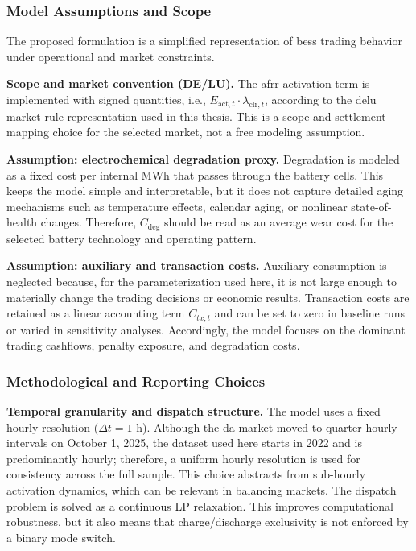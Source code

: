 \subsubsection{Model Assumptions and Scope}
The proposed formulation is a simplified representation of \gls{bess} trading behavior under operational and market constraints.

\textbf{Scope and market convention (DE/LU).}
The \gls{afrr} activation term is implemented with signed quantities, i.e., $E_{\text{act}, t}\cdot\lambda_{\text{clr}, t}$, according to the \gls{delu} market-rule representation used in this thesis.
This is a scope and settlement-mapping choice for the selected market, not a free modeling assumption.

\textbf{Assumption: electrochemical degradation proxy.}
Degradation is modeled as a fixed cost per internal MWh that passes through the battery cells.
This keeps the model simple and interpretable, but it does not capture detailed aging mechanisms such as temperature effects, calendar aging, or nonlinear state-of-health changes.
Therefore, $C_{\text{deg}}$ should be read as an average wear cost for the selected battery technology and operating pattern.

\textbf{Assumption: auxiliary and transaction costs.}
Auxiliary consumption is neglected because, for the parameterization used here, it is not large enough to materially change the trading decisions or economic results.
Transaction costs are retained as a linear accounting term $C_{tx,t}$ and can be set to zero in baseline runs or varied in sensitivity analyses.
Accordingly, the model focuses on the dominant trading cashflows, penalty exposure, and degradation costs.

\subsubsection{Methodological and Reporting Choices}
\textbf{Temporal granularity and dispatch structure.}
The model uses a fixed hourly resolution ($\Delta t = 1$ h).
Although the \gls{da} market moved to quarter-hourly intervals on October 1, 2025, the dataset used here starts in 2022 and is predominantly hourly; therefore, a uniform hourly resolution is used for consistency across the full sample.
This choice abstracts from sub-hourly activation dynamics, which can be relevant in balancing markets.
The dispatch problem is solved as a continuous LP relaxation. This improves computational robustness, but it also means that charge/discharge exclusivity is not enforced by a binary mode switch.


